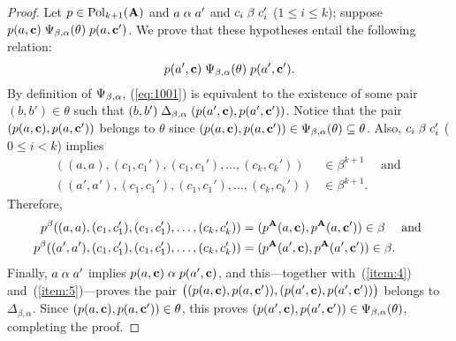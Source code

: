 \begin{proof}
    Let $p \in \operatorname{Pol}_{k+1}(\mathbf{A})$ and $a \mathrel{\alpha} a'$ and $c_i \mathrel{\beta} c_i'$ ($1\leq i\leq k$);
    suppose $p(a, \mathbf{c}) \mathrel{\Psi_{\beta, \alpha}(\theta)} p(a, \mathbf{c}')$.
    We prove that these hypotheses entail the following relation:
    \begin{equation}
      \label{eq:1001}
      p(a', \mathbf{c}) \mathrel{\Psi_{\beta, \alpha}(\theta)} p(a', \mathbf{c}').
    \end{equation}
    By definition of $\Psi_{\beta, \alpha}$, (\ref{eq:1001}) 
    is equivalent to the existence of
    some pair $(b,b') \in \theta$ such that
    $(b,b') \mathrel{\Delta_{\beta, \alpha}} (p(a', \mathbf{c}), p(a', \mathbf{c}'))$.
    Notice that the pair $(p(a, \mathbf{c}), p(a, \mathbf{c}'))$
    belongs to $\theta$ since
    $(p(a, \mathbf{c}), p(a, \mathbf{c}')) \in \Psi_{\beta, \alpha}(\theta) \subseteq \theta$.  Also,
    $c_i \mathrel{\beta} c_i'$ ($0\leq i<k$) implies
    \begin{align*}
    ((a,a), (c_1, c_1'), (c_1, c_1'), \dots, (c_{k}, c_{k}'))&\in \beta^{k+1} \quad \text{ and }\\
    ((a',a'), (c_1, c_1'), (c_1, c_1'), \dots, (c_{k}, c_{k}')) &\in \beta^{k+1}.
    \end{align*}
    Therefore,
    \begin{align}
      \label{item:4}
    p^{\beta}((a,a), (c_1, c_1'), (c_1, c_1'), \dots, (c_{k}, c_{k}'))
    &= (p^{\mathbf{A}}(a, \mathbf{c}), p^{\mathbf{A}}(a, \mathbf{c}')) \in \beta  \quad \text{ and }\\
    \label{item:5}
    p^{\beta}((a',a'), (c_1, c_1'), (c_1, c_1'), \dots, (c_{k}, c_{k}'))
    &= (p^{\mathbf{A}}(a', \mathbf{c}), p^{\mathbf{A}}(a', \mathbf{c}')) \in \beta.
    \end{align}
    Finally, $a\mathrel{\alpha} a'$ implies $p(a, \mathbf{c}) \mathrel{\alpha} p(a', \mathbf{c})$, and this---together
    with~(\ref{item:4}) and~(\ref{item:5})---proves the pair
    $\bigl((p(a, \mathbf{c}), p(a, \mathbf{c}')), (p(a', \mathbf{c}), p(a', \mathbf{c}'))\bigr)$
    belongs to  $\mathrel{\Delta_{\beta, \alpha}}$.
    Since  $(p(a, \mathbf{c}), p(a, \mathbf{c}')) \in \theta$, this proves
    $(p(a', \mathbf{c}), p(a', \mathbf{c}')) \in \Psi_{\beta, \alpha}(\theta)$, completing the proof.
  \end{proof}

